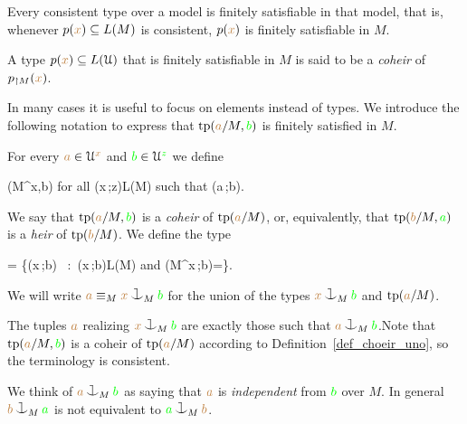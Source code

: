 \begin{proposition}\label{prop_coher_over_model}
    Every consistent type over a model is finitely satisfiable in that model, that is, whenever $p({\color{brown} x})\subseteq L(M)$ is consistent, $p({\color{brown} x})$ is finitely satisfiable in $M$.
\end{proposition}

\begin{definition}\label{def_choeir_uno} A type $p({\color{brown} x}) \subseteq L(\EuScript U)$ that is finitely satisfiable in $M$ is said to be a \emph{coheir\/} of $p_{\restriction M}({\color{brown} x})$.
\end{definition}


In many cases it is useful to focus on elements instead of types.
We introduce the following notation to express that ${\rm tp}({\color{brown} a}/M,{\color{green} b})$ is finitely satisfied in $M$.

\begin{definition}\label{def_coheir_idepencence} 
  For every ${\color{brown} a}\in\EuScript U^{\color{brown} x}$ and ${\color{green} b}\in\EuScript U^{\color{green} z}$ we define

  \noindent\llap{\textcolor{red}{\Large\warning}\kern1.5ex}
  {\IFF}
  {\phi(M^{\mr x},{\gr b})\neq\0
  \textrm{ for all }\phi({\mr x}\,;{\gr z})\in L(M) 
  \textrm{ such that }\phi({\mr a}\,;{\gr b})}.

  We say that ${\rm tp}({\color{brown} a}/M,{\color{green} b})$ is a \emph{coheir} of ${\rm tp}({\color{brown} a}/M)$, or, equivalently, that ${\rm tp}({\color{brown} b}/M,{\color{green} a})$ is a \emph{heir} of ${\rm tp}({\color{brown} b}/M)$.
  We define the type

  {=}
  {\Big\{\neg\phi({\mr x}\,;{\gr b})
  \ :\ 
  \phi({\mr x}\,;{\gr b})\in L(M)
  \textrm{ and } \phi(M^{\mr x}\,;{\gr b})=\0\Big\}.}

  We will write \emph{${\mr a}\equiv_M{\mr x}\cnonfork_M{\gr b}$} 
  for the union of the types ${\mr x}\cnonfork_M{\gr b}$ and 
  ${\rm tp}({\color{brown} a}/M)$.
\end{definition}
 The tuples ${\color{brown} a}$ realizing ${\mr x}\cnonfork_M{\gr b}$ are exactly those such that ${\mr a}\cnonfork_M{\gr b}$.Note that ${\rm tp}({\color{brown} a}/M,{\color{green} b})$ is a coheir of ${\rm tp}({\color{brown} a}/M)$ according to Definition~\ref{def_choeir_uno}, so the terminology is consistent.

We think of  ${\mr a}\cnonfork_M{\gr b}$ as saying that 
${\color{brown} a}$ is \emph{independent\/} from ${\color{green} b}$ over $M$.
%
%
In general %
${\mr b}\cnonfork_M{\gr a}$ is not 
equivalent to ${\gr a}\cnonfork_M{\mr b}$.

